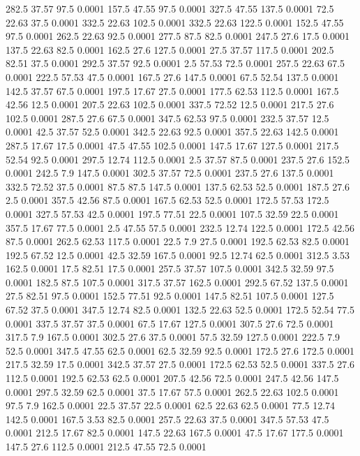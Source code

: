 282.5	37.57	97.5	0.0001
157.5	47.55	97.5	0.0001
327.5	47.55	137.5	0.0001
72.5	22.63	37.5	0.0001
332.5	22.63	102.5	0.0001
332.5	22.63	122.5	0.0001
152.5	47.55	97.5	0.0001
262.5	22.63	92.5	0.0001
277.5	87.5	82.5	0.0001
247.5	27.6	17.5	0.0001
137.5	22.63	82.5	0.0001
162.5	27.6	127.5	0.0001
27.5	37.57	117.5	0.0001
202.5	82.51	37.5	0.0001
292.5	37.57	92.5	0.0001
2.5	57.53	72.5	0.0001
257.5	22.63	67.5	0.0001
222.5	57.53	47.5	0.0001
167.5	27.6	147.5	0.0001
67.5	52.54	137.5	0.0001
142.5	37.57	67.5	0.0001
197.5	17.67	27.5	0.0001
177.5	62.53	112.5	0.0001
167.5	42.56	12.5	0.0001
207.5	22.63	102.5	0.0001
337.5	72.52	12.5	0.0001
217.5	27.6	102.5	0.0001
287.5	27.6	67.5	0.0001
347.5	62.53	97.5	0.0001
232.5	37.57	12.5	0.0001
42.5	37.57	52.5	0.0001
342.5	22.63	92.5	0.0001
357.5	22.63	142.5	0.0001
287.5	17.67	17.5	0.0001
47.5	47.55	102.5	0.0001
147.5	17.67	127.5	0.0001
217.5	52.54	92.5	0.0001
297.5	12.74	112.5	0.0001
2.5	37.57	87.5	0.0001
237.5	27.6	152.5	0.0001
242.5	7.9	147.5	0.0001
302.5	37.57	72.5	0.0001
237.5	27.6	137.5	0.0001
332.5	72.52	37.5	0.0001
87.5	87.5	147.5	0.0001
137.5	62.53	52.5	0.0001
187.5	27.6	2.5	0.0001
357.5	42.56	87.5	0.0001
167.5	62.53	52.5	0.0001
172.5	57.53	172.5	0.0001
327.5	57.53	42.5	0.0001
197.5	77.51	22.5	0.0001
107.5	32.59	22.5	0.0001
357.5	17.67	77.5	0.0001
2.5	47.55	57.5	0.0001
232.5	12.74	122.5	0.0001
172.5	42.56	87.5	0.0001
262.5	62.53	117.5	0.0001
22.5	7.9	27.5	0.0001
192.5	62.53	82.5	0.0001
192.5	67.52	12.5	0.0001
42.5	32.59	167.5	0.0001
92.5	12.74	62.5	0.0001
312.5	3.53	162.5	0.0001
17.5	82.51	17.5	0.0001
257.5	37.57	107.5	0.0001
342.5	32.59	97.5	0.0001
182.5	87.5	107.5	0.0001
317.5	37.57	162.5	0.0001
292.5	67.52	137.5	0.0001
27.5	82.51	97.5	0.0001
152.5	77.51	92.5	0.0001
147.5	82.51	107.5	0.0001
127.5	67.52	37.5	0.0001
347.5	12.74	82.5	0.0001
132.5	22.63	52.5	0.0001
172.5	52.54	77.5	0.0001
337.5	37.57	37.5	0.0001
67.5	17.67	127.5	0.0001
307.5	27.6	72.5	0.0001
317.5	7.9	167.5	0.0001
302.5	27.6	37.5	0.0001
57.5	32.59	127.5	0.0001
222.5	7.9	52.5	0.0001
347.5	47.55	62.5	0.0001
62.5	32.59	92.5	0.0001
172.5	27.6	172.5	0.0001
217.5	32.59	17.5	0.0001
342.5	37.57	27.5	0.0001
172.5	62.53	52.5	0.0001
337.5	27.6	112.5	0.0001
192.5	62.53	62.5	0.0001
207.5	42.56	72.5	0.0001
247.5	42.56	147.5	0.0001
297.5	32.59	62.5	0.0001
37.5	17.67	57.5	0.0001
262.5	22.63	102.5	0.0001
97.5	7.9	162.5	0.0001
22.5	37.57	22.5	0.0001
62.5	22.63	62.5	0.0001
77.5	12.74	142.5	0.0001
167.5	3.53	82.5	0.0001
257.5	22.63	37.5	0.0001
347.5	57.53	47.5	0.0001
212.5	17.67	82.5	0.0001
147.5	22.63	167.5	0.0001
47.5	17.67	177.5	0.0001
147.5	27.6	112.5	0.0001
212.5	47.55	72.5	0.0001

